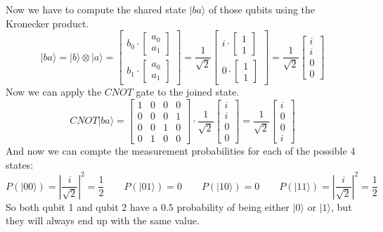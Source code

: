 \documentclass{article}
\begin{document}
  Now we have to compute the shared state $|ba\rangle$ of those qubits using the Kronecker product.
  \[ |ba\rangle = |b\rangle \otimes |a\rangle = \begin{bmatrix}
    b_0 \cdot \begin{bmatrix}
      a_0 \\ a_1
    \end{bmatrix} \\[4mm]
    b_1 \cdot \begin{bmatrix}
      a_0 \\ a_1
    \end{bmatrix}
  \end{bmatrix} = \frac{1}{\sqrt{2}}\begin{bmatrix}
    i \cdot \begin{bmatrix}
      1 \\ 1
    \end{bmatrix} \\[4mm]
    0 \cdot \begin{bmatrix}
      1 \\ 1
    \end{bmatrix}
  \end{bmatrix} = \frac{1}{\sqrt{2}}\begin{bmatrix}
    i \\ i \\ 0 \\ 0
  \end{bmatrix} \]
  Now we can apply the $CNOT$ gate to the joined state.
  \[ CNOT|ba\rangle = \begin{bmatrix}
    1 & 0 & 0 & 0 \\
    0 & 0 & 0 & 1 \\
    0 & 0 & 1 & 0 \\
    0 & 1 & 0 & 0
  \end{bmatrix} \cdot \frac{1}{\sqrt{2}}\begin{bmatrix}
    i \\ i \\ 0 \\ 0
  \end{bmatrix} = \frac{1}{\sqrt{2}} \begin{bmatrix}
    i \\ 0 \\ 0 \\ i
  \end{bmatrix}\]
  And now we can compte the measurement probabilities for each of the possible 4 states:
  \[ P(|00\rangle) = \left|\frac{i}{\sqrt{2}}\right|^2 = \frac{1}{2}\qquad
     P(|01\rangle) = 0\qquad
     P(|10\rangle) = 0\qquad
     P(|11\rangle) = \left|\frac{i}{\sqrt{2}}\right|^2 = \frac{1}{2}
     \]
  So both qubit 1 and qubit 2 have a $0.5$ probability of being either $|0\rangle$ or $|1\rangle$,
  but they will always end up with the same value.
\end{document}
